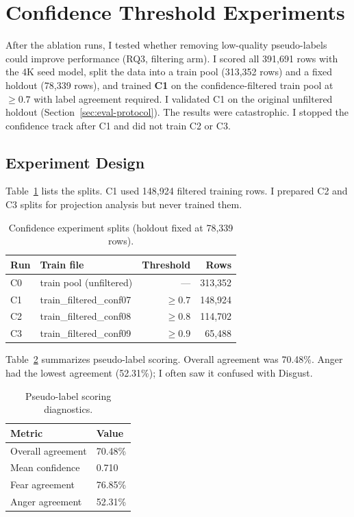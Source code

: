 \documentclass[11pt,a4paper]{article}
\begin{document}
\section{Confidence Threshold Experiments}
\label{sec:confidence}

After the ablation runs, I tested whether removing low-quality pseudo-labels could improve performance (RQ3, filtering arm). I scored all 391,691 rows with the 4K seed model, split the data into a train pool (313,352 rows) and a fixed holdout (78,339 rows), and trained \textbf{C1} on the confidence-filtered train pool at $\geq 0.7$ with label agreement required. I validated C1 on the original unfiltered holdout (Section~\ref{sec:eval-protocol}). The results were catastrophic. I stopped the confidence track after C1 and did not train C2 or C3.

\subsection{Experiment Design}

Table~\ref{tab:confidence_splits} lists the splits. C1 used 148,924 filtered training rows. I prepared C2 and C3 splits for projection analysis but never trained them.

\begin{table}[H]
\centering
\caption{Confidence experiment splits (holdout fixed at 78,339 rows).}
\label{tab:confidence_splits}
\begin{tabular}{@{}llrr@{}}
\toprule
Run & Train file & Threshold & Rows \\
\midrule
C0 & train pool (unfiltered) & ---   & 313,352 \\
C1 & train\_filtered\_conf07  & $\geq 0.7$ & 148,924 \\
C2 & train\_filtered\_conf08  & $\geq 0.8$ & 114,702 \\
C3 & train\_filtered\_conf09  & $\geq 0.9$ &  65,488 \\
\bottomrule
\end{tabular}
\end{table}

Table~\ref{tab:scoring} summarizes pseudo-label scoring. Overall agreement was 70.48\%. Anger had the lowest agreement (52.31\%); I often saw it confused with Disgust.

\begin{table}[H]
\centering
\caption{Pseudo-label scoring diagnostics.}
\label{tab:scoring}
\begin{tabular}{@{}ll@{}}
\toprule
Metric & Value \\
\midrule
Overall agreement & 70.48\% \\
Mean confidence   & 0.710 \\
Fear agreement    & 76.85\% \\
Anger agreement   & 52.31\% \\
\bottomrule
\end{tabular}
\end{table}
\end{document}
